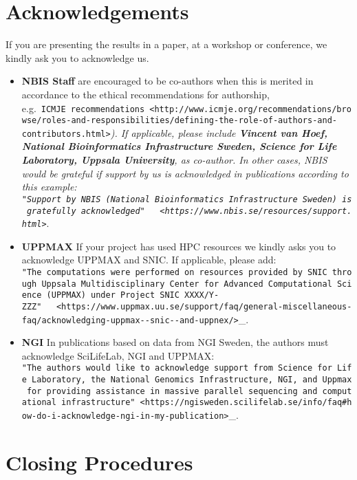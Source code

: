 \documentclass[
]{book}
\begin{document}
\hypertarget{acknowledgements}{%
\chapter{Acknowledgements}\label{acknowledgements}}

If you are presenting the results in a paper, at a workshop or conference, we kindly ask you to acknowledge us.

\begin{itemize}
\item
  \textbf{NBIS Staff} are encouraged to be co-authors when this is merited in accordance to the ethical recommendations for authorship, e.g.~\texttt{ICMJE\ recommendations\ \textless{}http://www.icmje.org/recommendations/browse/roles-and-responsibilities/defining-the-role-of-authors-and-contributors.html\textgreater{}}\emph{). If applicable, please include \textbf{Vincent van Hoef, National Bioinformatics Infrastructure Sweden, Science for Life Laboratory, Uppsala University}, as co-author. In other cases, NBIS would be grateful if support by us is acknowledged in publications according to this example: \texttt{"Support\ by\ NBIS\ (National\ Bioinformatics\ Infrastructure\ Sweden)\ is\ gratefully\ acknowledged"\ \ \ \textless{}https://www.nbis.se/resources/support.html\textgreater{}}}.
\item
  \textbf{UPPMAX} If your project has used HPC resources we kindly asks you to acknowledge UPPMAX and SNIC. If applicable, please add: \texttt{"The\ computations\ were\ performed\ on\ resources\ provided\ by\ SNIC\ through\ Uppsala\ Multidisciplinary\ Center\ for\ Advanced\ Computational\ Science\ (UPPMAX)\ under\ Project\ SNIC\ XXXX/Y-ZZZ"\ \ \ \textless{}https://www.uppmax.uu.se/support/faq/general-miscellaneous-faq/acknowledging-uppmax-\/-snic-\/-and-uppnex/\textgreater{}}\_.
\item
  \textbf{NGI} In publications based on data from NGI Sweden, the authors must acknowledge SciLifeLab, NGI and UPPMAX: \texttt{"The\ authors\ would\ like\ to\ acknowledge\ support\ from\ Science\ for\ Life\ Laboratory,\ the\ National\ Genomics\ Infrastructure,\ NGI,\ and\ Uppmax\ for\ providing\ assistance\ in\ massive\ parallel\ sequencing\ and\ computational\ infrastructure"\ \textless{}https://ngisweden.scilifelab.se/info/faq\#how-do-i-acknowledge-ngi-in-my-publication\textgreater{}}\_.
\end{itemize}

\hypertarget{closing-procedures}{%
\chapter{Closing Procedures}\label{closing-procedures}}
\end{document}
